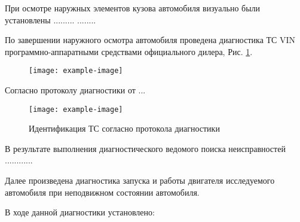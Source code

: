 



При осмотре наружных элементов кузова  автомобиля визуально были установлены .........
........


По завершении наружного осмотра автомобиля проведена диагностика ТС VIN \vin\, программно-аппаратными средствами   официального дилера, Рис. \ref{пд}.
\begin{figure}[H]
	\centering
	\texttt{[image: example-image]}
	\caption{}
	\label{пд}
\end{figure}

Согласно протоколу диагностики от ...  

\begin{figure}[H]
	\centering
	\texttt{[image: example-image]}
	\caption{Идентификация ТС согласно протокола диагностики}
	\label{модельсканер}
\end{figure}

В результате выполнения диагностического ведомого поиска неисправностей  ............






Далее произведена диагностика запуска и работы двигателя исследуемого автомобиля при неподвижном состоянии  автомобиля. 

В ходе данной диагностики установлено: